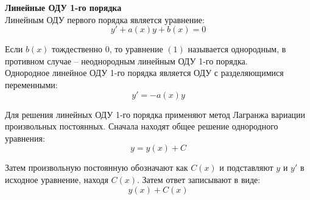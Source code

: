 \documentclass{article}
\begin{document}
	
	\textbf{Линейные ОДУ 1-го порядка}\\

	Линейным ОДУ первого порядка является уравнение:
	\begin{equation}
		y' + a(x)y + b(x) = 0
	\end{equation}

	Если $b(x)$ тождественно $0$, то уравнение $(1)$ называется однородным, в противном случае -- неоднородным линейным ОДУ 1-го порядка.\\

	Однородное линейное ОДУ 1-го порядка является ОДУ с разделяющимися переменными:
	\begin{equation}
		y' = -a(x)y
	\end{equation}

	Для решения линейных ОДУ 1-го порядка применяют метод Лагранжа вариации произвольных постоянных. Сначала находят общее решение однородного уравнения:
	\begin{equation}
		y = y(x)+C
	\end{equation}

	Затем произвольную постоянную обозначают как $C(x)$ и подставляют $y$ и $y'$ в исходное уравнение, находя $C(x)$. Затем ответ записывают в виде:
	\begin{equation}
		y(x) + C(x)
	\end{equation}
\end{document}
